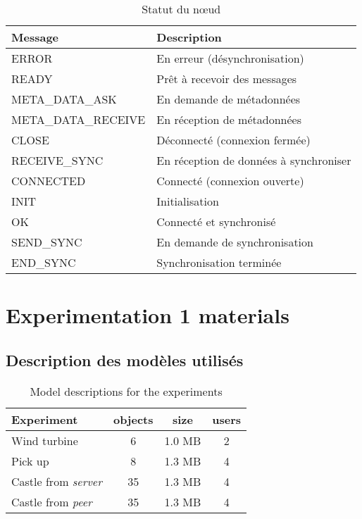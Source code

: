 \begin{table}[h]
	\centering
	\caption{Statut du n\oe ud}
	\label{table:nodestatus}
	\begin{tabular}{ll}
		\toprule
		\textbf{Message}             & \textbf{Description} \\ \midrule
		ERROR               &      En erreur (désynchronisation)       \\
		READY               &       Prêt à recevoir des messages      \\
		META\_DATA\_ASK     &      En demande de métadonnées       \\
		META\_DATA\_RECEIVE &      En réception de métadonnées       \\
		CLOSE               &     Déconnecté (connexion fermée)        \\
		RECEIVE\_SYNC       &      En réception de données à synchroniser    \\
		CONNECTED           &      Connecté (connexion ouverte)        \\
		INIT                &     Initialisation   \\
		OK                  &    Connecté et synchronisé      \\
		SEND\_SYNC          &    En demande de synchronisation         \\
		END\_SYNC           &      Synchronisation terminée      \\ \bottomrule
	\end{tabular}
\end{table}

\pagebreak
\section{Experimentation 1 materials}
\subsection{Description des modèles utilisés}
\begin{table}[h]
	\caption{\label{table:models_xp1}Model descriptions for the experiments}
	\centering
	\begin{tabular}{lccc}
		\textbf{Experiment} & \textbf{objects} & \textbf{size}	& \textbf{users}\\ \hline
		Wind turbine     			& 6					& 1.0 MB        	& 2 \\ 
		Pick up					& 8					& 1.3 MB         	& 4	\\
		Castle from \textit{server}	& 35				& 1.3 MB        	& 4	\\
		Castle from \textit{peer}& 35 & 1.3 MB & 4 \\ \hline
	\end{tabular}
\end{table}


